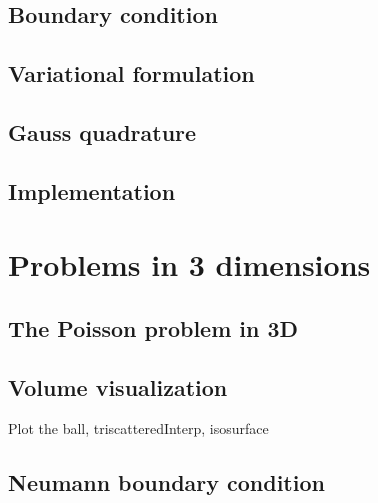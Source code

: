 \documentclass[paper=a4, fontsize=11pt]{scrartcl} %
\begin{document}
\subsection{Boundary condition}
\subsection{Variational formulation}
\subsection{Gauss quadrature}
\subsection{Implementation}

\section{Problems in 3 dimensions}
\subsection{The Poisson problem in 3D}
\subsection{Volume visualization}
Plot the ball, triscatteredInterp, isosurface
\subsection{Neumann boundary condition}
\end{document}
